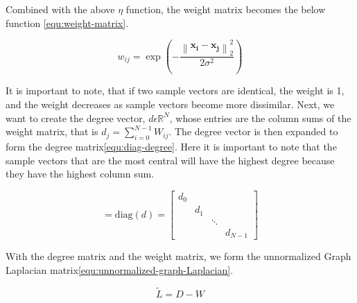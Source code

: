 \documentclass[11pt]{amsart}
\begin{document}
Combined with the above $\eta$ function, the weight matrix becomes the below function \eqref{equ:weight-matrix}.

\begin{equation}
    w_{ij} = \exp \left( -\frac{\left\| \mathbf{x_i} - \mathbf{x_j}\right\|_2^2}{2\sigma^2} \right)
    \label{equ:weight-matrix}
\end{equation}

It is important to note, that if two sample vectors are identical, the weight is 1, and the weight decreases as sample vectors 
become more dissimilar. Next, we want to create the degree vector, $d \epsilon \mathbb{R}^N$, whose entries are the column sums of 
the weight matrix, that is $d_j = \sum_{i=0}^{N-1} W_{ij}$. The degree vector is then expanded to form the degree matrix\eqref{equ:diag-degree}. Here it is 
important to note that the sample vectors that are the most central will have the highest degree because they have the highest column sum. 

\begin{equation}
    = \text{diag}(d) = 
    \begin{bmatrix}
        d_0 & & & \\
        & d_1 & & \\
        & & \ddots & \\
        & & & d_{N-1}
    \end{bmatrix}
    \label{equ:diag-degree}
\end{equation}

With the degree matrix and the weight matrix, we form the unnormalized Graph Laplacian matrix\eqref{equ:unnormalized-graph-Laplacian}.

\begin{equation}
    \tilde{L} = D - W
    \label{equ:unnormalized-graph-Laplacian}    
\end{equation}
\end{document}
